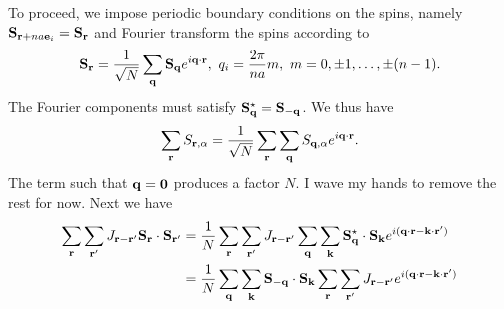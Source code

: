 To proceed, we impose periodic boundary conditions on the spins, namely $\vb{S}_{\vb{r} + na\vb{e}_{i}} = \vb{S}_{\vb{r}}$ and Fourier transform the spins according to
\begin{align*}
	\vb{S}_{\vb{r}} = \frac{1}{\sqrt{N}}\sum\limits_{\vb{q}}\vb{S}_{\vb{q}}e^{i\vb{q}\cdot\vb{r}},\ q_{i} = \frac{2\pi}{na}m,\ m = 0, \pm 1, \dots, \pm (n - 1).
\end{align*}
The Fourier components must satisfy $\vb{S}_{\vb{q}}^{\star} = \vb{S}_{-\vb{q}}$. We thus have
\begin{align*}
	\sum\limits_{\vb{r}}S_{\vb{r}, \alpha} = \frac{1}{\sqrt{N}}\sum\limits_{\vb{r}}\sum\limits_{\vb{q}}S_{\vb{q}, \alpha}e^{i\vb{q}\cdot\vb{r}}.
\end{align*}
The term such that $\vb{q} = \vb{0}$ produces a factor $N$. I wave my hands to remove the rest for now. Next we have
\begin{align*}
	\sum\limits_{\vb{r}}\sum\limits_{\vb{r}^{\prime}}J_{\vb{r} - \vb{r}^{\prime}}\vb{S}_{\vb{r}}\cdot\vb{S}_{\vb{r}^{\prime}} &= \frac{1}{N}\sum\limits_{\vb{r}}\sum\limits_{\vb{r}^{\prime}}J_{\vb{r} - \vb{r}^{\prime}}\sum\limits_{\vb{q}}\sum\limits_{\vb{k}}\vb{S}_{\vb{q}}^{\star}\cdot\vb{S}_{\vb{k}}e^{i(\vb{q}\cdot\vb{r} - \vb{k}\cdot\vb{r}^{\prime})} \\
	&= \frac{1}{N}\sum\limits_{\vb{q}}\sum\limits_{\vb{k}}\vb{S}_{-\vb{q}}\cdot\vb{S}_{\vb{k}}\sum\limits_{\vb{r}}\sum\limits_{\vb{r}^{\prime}}J_{\vb{r} - \vb{r}^{\prime}}e^{i(\vb{q}\cdot\vb{r} - \vb{k}\cdot\vb{r}^{\prime})}
\end{align*}

